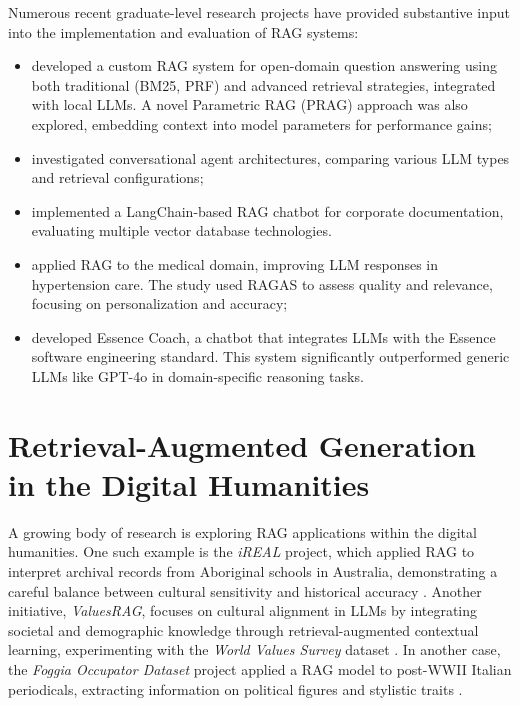 \begin{spacing}{1.5}
Numerous recent graduate-level research projects have provided substantive input into the implementation and evaluation of RAG systems:
\begin{itemize}
    \item \textcite{antolini_experimental_2025} developed a custom RAG system for open-domain question answering using both traditional (BM25, PRF) and advanced retrieval strategies, integrated with local LLMs. A novel Parametric RAG (PRAG) approach was also explored, embedding context into model parameters for performance gains;
    \item \textcite{caramanna_progettazione_2024} investigated conversational agent architectures, comparing various LLM types and retrieval configurations;
    \item \textcite{florio_progettazione_2024} implemented a LangChain-based RAG chatbot for corporate documentation, evaluating multiple vector database technologies.
    \item \textcite{salcuni_utilizzo_2025} applied RAG to the medical domain, improving LLM responses in hypertension care. The study used RAGAS to assess quality and relevance, focusing on personalization and accuracy;
    \item \textcite{nicoletti_llms_2025} developed Essence Coach, a chatbot that integrates LLMs with the Essence software engineering standard. This system significantly outperformed generic LLMs like GPT-4o in domain-specific reasoning tasks.
\end{itemize}

\section{Retrieval-Augmented Generation in the Digital Humanities}\label{sec:rag_dh}
A growing body of research is exploring RAG applications within the digital humanities. One such example is the \textit{iREAL} project, which applied RAG to interpret archival records from Aboriginal schools in Australia, demonstrating a careful balance between cultural sensitivity and historical accuracy \citep{callaghan_prototyping_2025}. Another initiative, \textit{ValuesRAG}, focuses on cultural alignment in LLMs by integrating societal and demographic knowledge through retrieval-augmented contextual learning, experimenting with the \textit{World Values Survey} dataset \citep{seo_valuesrag_2025}. In another case, the \textit{Foggia Occupator Dataset} project applied a RAG model to post-WWII Italian periodicals, extracting information on political figures and stylistic traits \citep{ciletti_retrieval-augmented_2025}.


\end{spacing}
